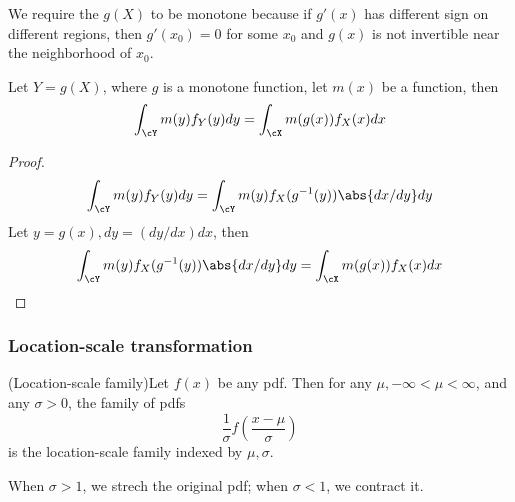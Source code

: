 \begin{refsection}
\begin{remark}
	We require the $g(X)$ to be monotone because if $g'(x)$ has different sign on different regions, then $g'(x_0) = 0$ for some $x_0$ and $g(x)$ is not invertible near the neighborhood of $x_0$.
\end{remark}

\begin{corollary}\label{ch:theory-of-probability:th:changeofvariablecorollary}
	Let $Y=g(X)$, where $g$ is a monotone function, let $m(x)$ be a function, then
	$$\int_\cY m(y)f_Y(y)dy = \int_\cX m(g(x))f_X(x)dx$$
\end{corollary}
\begin{proof}
	$$\int_\cY m(y)f_Y(y)dy = \int_\cY m(y)f_X(g^{-1}(y))\abs{dx/dy}dy$$
	Let $y = g(x), dy =( dy/dx) dx$, then
	$$\int_\cY m(y)f_X(g^{-1}(y))\abs{dx/dy}dy = \int_{\cX} m(g(x)) f_X(x) dx$$
\end{proof}






\subsubsection{Location-scale transformation}
\begin{definition}\cite{casella2002statistical}
(Location-scale family)Let $f(x)$ be any pdf. Then for any $\mu,-\infty< \mu < \infty$, and any $\sigma > 0$, the family of pdfs $$\frac{1}{\sigma} f(\frac{x-\mu}{\sigma})$$ is the location-scale family indexed by $\mu,\sigma$. 
\end{definition}
\begin{remark}
When $\sigma > 1$, we strech the original pdf; when $\sigma < 1$, we contract it.	
\end{remark}



\end{refsection}
